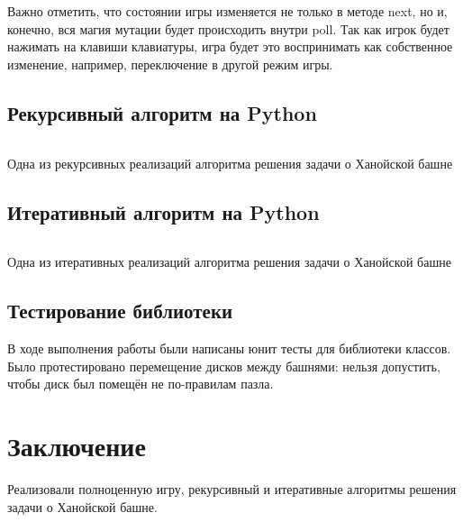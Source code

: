 Важно отметить, что состоянии игры изменяется не только в методе next, но и,
конечно, вся магия мутации будет происходить внутри poll. Так как игрок будет
нажимать на клавиши клавиатуры, игра будет это воспринимать как собственное
изменение, например, переключение в другой режим игры.

\subsection{Рекурсивный алгоритм на Python}

\begin{code}
	\inputminted[breaklines=true, xleftmargin=1em, linenos, frame=single,
		framesep=10pt, fontsize=\footnotesize, firstline=119,
		lastline=137]{python}{../src/src/gamestate.py}
	\caption{Одна из рекурсивных реализаций алгоритма решения задачи о Ханойской
		башне}
\end{code}


\subsection{Итеративный алгоритм на Python}

\begin{code}
	\inputminted[breaklines=true, xleftmargin=1em, linenos, frame=single,
		framesep=10pt, fontsize=\footnotesize, firstline=139,
		lastline=168]{python}{../src/src/gamestate.py}
	\caption{Одна из итеративных реализаций алгоритма решения задачи о Ханойской
		башне}
\end{code}

\subsection{Тестирование библиотеки}

В ходе выполнения работы были написаны юнит тесты для библиотеки классов.
Было протестировано перемещение дисков между башнями: нельзя допустить, чтобы
диск был помещён не по-правилам пазла.

\section*{Заключение}
Реализовали полноценную игру, рекурсивный и итеративные алгоритмы решения
задачи о Ханойской башне.
